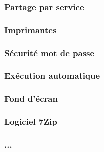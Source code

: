 		\subsubsection{Partage par service}
		\subsubsection{Imprimantes}
		\subsubsection{Sécurité mot de passe}
		\subsubsection{Exécution automatique}
		\subsubsection{Fond d'écran}
		\subsubsection{Logiciel 7Zip}
		\subsubsection{...}